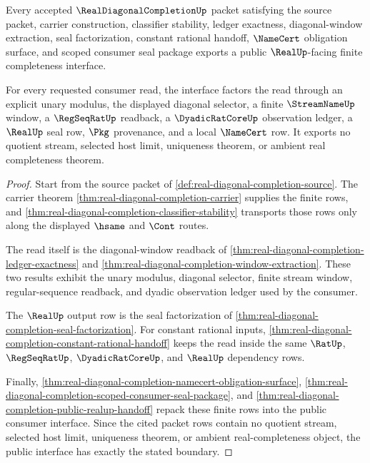 \begin{theorem}
\label{thm:real-diagonal-completion-public-finite-completeness-interface}
Every accepted $\RealDiagonalCompletionUp$ packet satisfying the source packet, carrier construction, classifier stability, ledger exactness, diagonal-window extraction, seal factorization, constant rational handoff, $\NameCert$ obligation surface, and scoped consumer seal package exports a public $\RealUp$-facing finite completeness interface.

For every requested consumer read, the interface factors the read through an explicit unary modulus, the displayed diagonal selector, a finite $\StreamNameUp$ window, a $\RegSeqRatUp$ readback, a $\DyadicRatCoreUp$ observation ledger, a $\RealUp$ seal row, $\Pkg$ provenance, and a local $\NameCert$ row. It exports no quotient stream, selected host limit, uniqueness theorem, or ambient real completeness theorem.
\end{theorem}
\begin{proof}
Start from the source packet of \autoref{def:real-diagonal-completion-source}. The carrier theorem \autoref{thm:real-diagonal-completion-carrier} supplies the finite rows, and \autoref{thm:real-diagonal-completion-classifier-stability} transports those rows only along the displayed $\hsame$ and $\Cont$ routes.

The read itself is the diagonal-window readback of \autoref{thm:real-diagonal-completion-ledger-exactness} and \autoref{thm:real-diagonal-completion-window-extraction}. These two results exhibit the unary modulus, diagonal selector, finite stream window, regular-sequence readback, and dyadic observation ledger used by the consumer.

The $\RealUp$ output row is the seal factorization of \autoref{thm:real-diagonal-completion-seal-factorization}. For constant rational inputs, \autoref{thm:real-diagonal-completion-constant-rational-handoff} keeps the read inside the same $\RatUp$, $\RegSeqRatUp$, $\DyadicRatCoreUp$, and $\RealUp$ dependency rows.

Finally, \autoref{thm:real-diagonal-completion-namecert-obligation-surface}, \autoref{thm:real-diagonal-completion-scoped-consumer-seal-package}, and \autoref{thm:real-diagonal-completion-public-realup-handoff} repack these finite rows into the public consumer interface. Since the cited packet rows contain no quotient stream, selected host limit, uniqueness theorem, or ambient real-completeness object, the public interface has exactly the stated boundary.
\end{proof}

